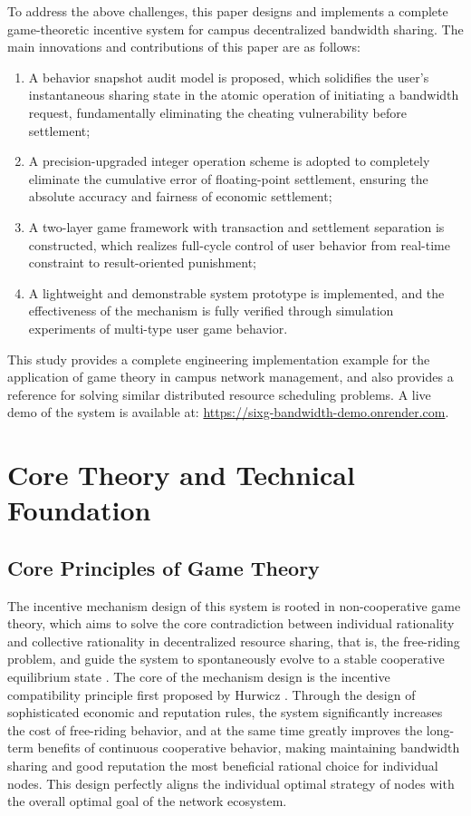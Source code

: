 \documentclass[conference,letterpaper]{IEEEtran}
\begin{document}
To address the above challenges, this paper designs and implements a complete game-theoretic incentive system for campus decentralized bandwidth sharing. The main innovations and contributions of this paper are as follows:

\begin{enumerate}
\item A behavior snapshot audit model is proposed, which solidifies the user's instantaneous sharing state in the atomic operation of initiating a bandwidth request, fundamentally eliminating the cheating vulnerability before settlement;
\item A precision-upgraded integer operation scheme is adopted to completely eliminate the cumulative error of floating-point settlement, ensuring the absolute accuracy and fairness of economic settlement;
\item A two-layer game framework with transaction and settlement separation is constructed, which realizes full-cycle control of user behavior from real-time constraint to result-oriented punishment;
\item A lightweight and demonstrable system prototype is implemented, and the effectiveness of the mechanism is fully verified through simulation experiments of multi-type user game behavior.
\end{enumerate}

This study provides a complete engineering implementation example for the application of game theory in campus network management, and also provides a reference for solving similar distributed resource scheduling problems. A live demo of the system is available at: \url{https://sixg-bandwidth-demo.onrender.com}.

\section{Core Theory and Technical Foundation}

\subsection{Core Principles of Game Theory}

The incentive mechanism design of this system is rooted in non-cooperative game theory, which aims to solve the core contradiction between individual rationality and collective rationality in decentralized resource sharing, that is, the free-riding problem, and guide the system to spontaneously evolve to a stable cooperative equilibrium state \cite{li2018}. The core of the mechanism design is the incentive compatibility principle first proposed by Hurwicz \cite{hurwicz1973}. Through the design of sophisticated economic and reputation rules, the system significantly increases the cost of free-riding behavior, and at the same time greatly improves the long-term benefits of continuous cooperative behavior, making maintaining bandwidth sharing and good reputation the most beneficial rational choice for individual nodes. This design perfectly aligns the individual optimal strategy of nodes with the overall optimal goal of the network ecosystem.
\end{document}
